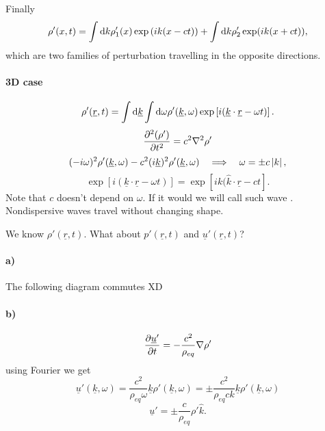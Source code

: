 \documentclass[11pt,oneside]{book}
\renewcommand{\vec}[1]{\underline{#1}}
\theoremstyle{definition} %
\theoremstyle{plain} %
\theoremstyle{remark} %
\theoremstyle{underline}
\begin{document}
  Finally
  \begin{displaymath}
    \rho'(x, t) = \int \mathrm{d} k \rho_1'(x) \exp\left( i k (x - c t) \right) + \int \mathrm{d} k \rho_2' \exp(ik ( x + ct)),
  \end{displaymath}
  which are two families of perturbation travelling in the opposite directions.

  \paragraph{3D case}

  \begin{displaymath}
    \rho'(\vec r, t) = \int \d \vec k \int \d \omega \rho'(\vec k, \omega) \exp\left[ i( \vec k \cdot \vec r - \omega t )\right].
  \end{displaymath}
  \begin{displaymath}
    \frac{\partial^2 (\rho')}{\partial t ^ 2} = c^2 \nabla^2 \rho'
  \end{displaymath}
  \begin{displaymath}
    (- i\omega)^2 \rho'(\vec k, \omega) - c^2 (i\vec k)^2 \rho'(\vec k, \omega) \qLRa \omega = \pm c \abs{k},
  \end{displaymath}
  \begin{displaymath}
    \exp\left[ i(\vec k \cdot \vec r - \omega t) \right] = \exp\left[ i k ( \hat{k} \cdot \vec r - c t \right].
  \end{displaymath}
  Note that $c$ doesn't depend on $\omega$. 
  If it would we will call such wave .
  Nondispersive waves travel without changing shape.

  We know $\rho'(\vec r, t)$. What about $p'(\vec r, t)$ and $\vec u'(\vec r, t)$?

  \paragraph{a)}
  The following diagram commutes XD
  \begin{center}
  \end{center}


  \paragraph{b)}
  \begin{displaymath}
    \ptf{\vec u'}{t}  = - \frac{c^2}{\rho_{eq}} \nabla \rho'
  \end{displaymath}
  using Fourier we get
  \begin{displaymath}
    \vec u' (\vec k, \omega) = \frac{c^2}{\rho_{eq}\omega}\vec k \rho'(\vec k, \omega) 
    = \pm\frac{c^2}{\rho_{eq} ck } \vec k \rho'(\vec k, \omega) 
  \end{displaymath}
  \begin{displaymath}
    \vec u' = \pm  \frac{c}{\rho_{eq}} \rho' \hat k.
  \end{displaymath}
\end{document}
